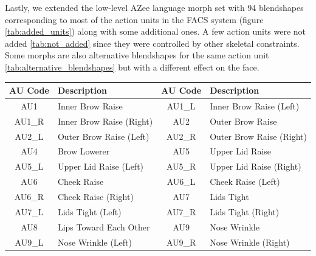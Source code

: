 \documentclass[../../main.tex]{subfiles}
\begin{document}
Lastly, we extended the low-level AZee language morph set with 94 blendshapes corresponding to most of the action units in the FACS system (figure \ref{tab:added_units}) along with some additional ones. A few action units were not added \ref{tab:not_added} since they were controlled by other skeletal constraints. Some morphs are also alternative blendshapes for the same action unit \ref{tab:alternative_blendshapes} but with a different effect on the face.

\begin{table}[h]
    \centering
    \scriptsize
    \begin{tabular}{|c|l|c|l|}
        \hline
        \textbf{AU Code} & \textbf{Description}                     & \textbf{AU Code} & \textbf{Description}                      \\ \hline
        AU1              & Inner Brow Raise                        & AU1\_L            & Inner Brow Raise (Left)                   \\ \hline
        AU1\_R           & Inner Brow Raise (Right)                & AU2              & Outer Brow Raise                          \\ \hline
        AU2\_L           & Outer Brow Raise (Left)                 & AU2\_R            & Outer Brow Raise (Right)                  \\ \hline
        AU4              & Brow Lowerer                            & AU5              & Upper Lid Raise                           \\ \hline
        AU5\_L           & Upper Lid Raise (Left)                  & AU5\_R            & Upper Lid Raise (Right)                   \\ \hline
        AU6              & Cheek Raise                             & AU6\_L            & Cheek Raise (Left)                        \\ \hline
        AU6\_R           & Cheek Raise (Right)                     & AU7              & Lids Tight                                \\ \hline
        AU7\_L           & Lids Tight (Left)                       & AU7\_R            & Lids Tight (Right)                        \\ \hline
        AU8              & Lips Toward Each Other                  & AU9              & Nose Wrinkle                              \\ \hline
        AU9\_L           & Nose Wrinkle (Left)                     & AU9\_R            & Nose Wrinkle (Right)                      \\ \hline

\end{tabular}
\end{table}
\end{document}
